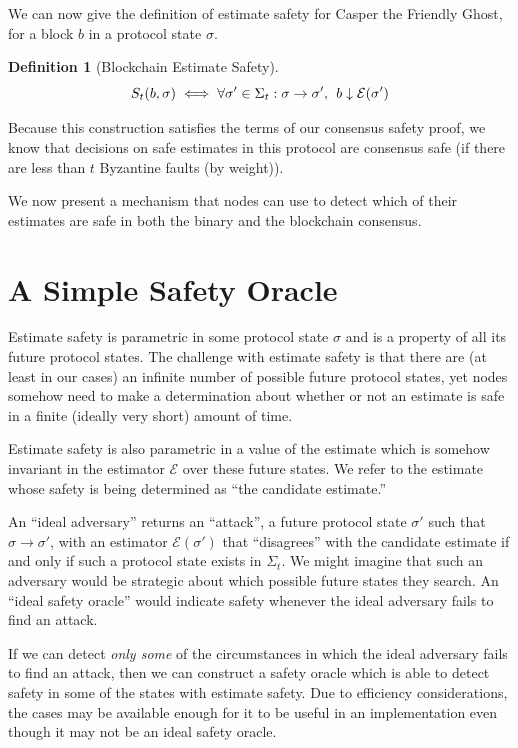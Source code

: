 \documentclass{article}
\theoremstyle{definition}
\newtheorem{defn}{Definition}[section]
\begin{document}
We can now give the definition of estimate safety for Casper the Friendly Ghost, for a block $b$ in a protocol state $\sigma$.

\begin{defn}[Blockchain Estimate Safety]
$$
S_t(b, \sigma) \iff \forall \sigma' \in \Sigma_t: \sigma \to \sigma',\hspace{1.5mm} b \downarrow \mathcal{E}(\sigma')
$$
\end{defn}

Because this construction satisfies the terms of our consensus safety proof, we know that decisions on safe estimates in this protocol are consensus safe (if there are less than $t$ Byzantine faults (by weight)).

We now present a mechanism that nodes can use to detect which of their estimates are safe in both the binary and the blockchain consensus.

\section{A Simple Safety Oracle}

Estimate safety is parametric in some protocol state $\sigma$ and is a property of all its future protocol states. The challenge with estimate safety is that there are (at least in our cases) an infinite number of possible future protocol states, yet nodes somehow need to make a determination about whether or not an estimate is safe in a finite (ideally very short) amount of time.

Estimate safety is also parametric in a value of the estimate which is somehow invariant in the estimator $\mathcal{E}$ over these future states. We refer to the estimate whose safety is being determined as ``the candidate estimate.''

An ``ideal adversary'' returns an ``attack'', a future protocol state $\sigma'$ such that $\sigma \to \sigma'$, with an estimator $\mathcal{E}(\sigma')$ that ``disagrees'' with the candidate estimate if and only if such a protocol state exists in $\Sigma_t$. We might imagine that such an adversary would be strategic about which possible future states they search. An ``ideal safety oracle'' would indicate safety whenever the ideal adversary fails to find an attack.

If we can detect \emph{only some} of the circumstances in which the ideal adversary fails to find an attack, then we can construct a safety oracle which is able to detect safety in some of the states with estimate safety. Due to efficiency considerations, the cases may be available enough for it to be useful in an implementation even though it may not be an ideal safety oracle.
\end{document}
